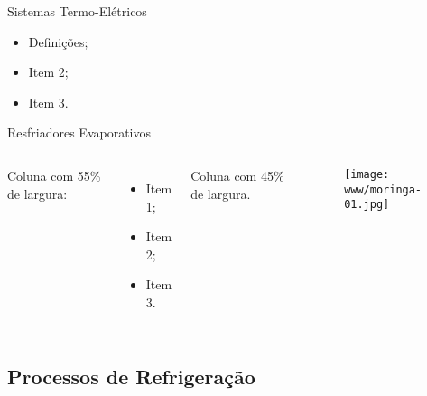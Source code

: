     \begin{frame}{Sistemas Termo-Elétricos}\vspace*{-2em}
        \begin{itemize}
            \item<1-> Definições;
            \item<1-> Item 2;
            \item<1-> Item 3.
        \end{itemize}
    \end{frame}

    \begin{frame}{Resfriadores Evaporativos}\vspace*{-2em}
        \begin{columns}
            Coluna com 55\% de largura:\\[\smallskipamount]
            \begin{itemize}
                \item<1-> Item 1;
                \item<2-> Item 2;
                \item<3-> Item 3.
            \end{itemize}
            Coluna com 45\% de largura.
            \begin{center}
                \begin{figure}
                    \texttt{[image: www/moringa-01.jpg]}
                \end{figure}
            \end{center}
        \end{columns}
    \end{frame}

\subsection{Processos de Refrigeração}


